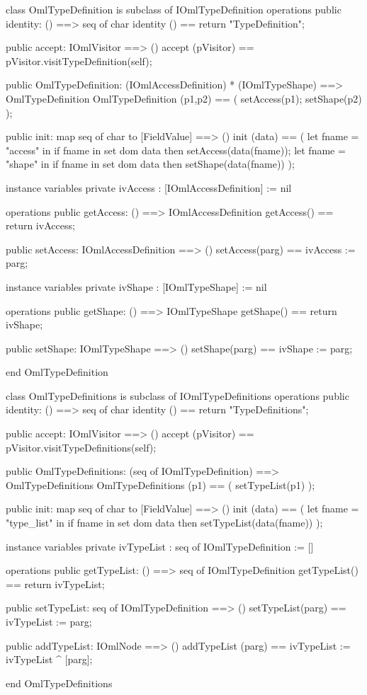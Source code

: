 \begin{vdm_al}
class OmlTypeDefinition is subclass of IOmlTypeDefinition
operations
  public identity: () ==> seq of char
  identity () == return "TypeDefinition";

  public accept: IOmlVisitor ==> ()
  accept (pVisitor) == pVisitor.visitTypeDefinition(self);

  public OmlTypeDefinition:
      (IOmlAccessDefinition) *
      (IOmlTypeShape) ==> OmlTypeDefinition
  OmlTypeDefinition (p1,p2) == 
   ( setAccess(p1);
     setShape(p2) );

  public init: map seq of char to [FieldValue] ==> ()
  init (data) ==
    ( let fname = "access" in
        if fname in set dom data
        then setAccess(data(fname));
      let fname = "shape" in
        if fname in set dom data
        then setShape(data(fname)) );

instance variables
  private ivAccess : [IOmlAccessDefinition] := nil

operations
  public getAccess: () ==> IOmlAccessDefinition
  getAccess() == return ivAccess;

  public setAccess: IOmlAccessDefinition ==> ()
  setAccess(parg) == ivAccess := parg;

instance variables
  private ivShape : [IOmlTypeShape] := nil

operations
  public getShape: () ==> IOmlTypeShape
  getShape() == return ivShape;

  public setShape: IOmlTypeShape ==> ()
  setShape(parg) == ivShape := parg;

end OmlTypeDefinition
\end{vdm_al}

\begin{vdm_al}
class OmlTypeDefinitions is subclass of IOmlTypeDefinitions
operations
  public identity: () ==> seq of char
  identity () == return "TypeDefinitions";

  public accept: IOmlVisitor ==> ()
  accept (pVisitor) == pVisitor.visitTypeDefinitions(self);

  public OmlTypeDefinitions:
      (seq of IOmlTypeDefinition) ==> OmlTypeDefinitions
  OmlTypeDefinitions (p1) == 
   ( setTypeList(p1) );

  public init: map seq of char to [FieldValue] ==> ()
  init (data) ==
    ( let fname = "type_list" in
        if fname in set dom data
        then setTypeList(data(fname)) );

instance variables
  private ivTypeList : seq of IOmlTypeDefinition := []

operations
  public getTypeList: () ==> seq of IOmlTypeDefinition
  getTypeList() == return ivTypeList;

  public setTypeList: seq of IOmlTypeDefinition ==> ()
  setTypeList(parg) == ivTypeList := parg;

  public addTypeList: IOmlNode ==> ()
  addTypeList (parg) == ivTypeList := ivTypeList ^ [parg];

end OmlTypeDefinitions
\end{vdm_al}

